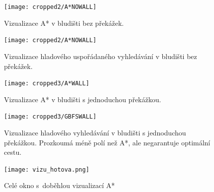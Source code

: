 \documentclass[12pt]{report}			%
\begin{document}
\begin{appendices}
\begin{figure}[h]
    
\end{figure}	








\begin{figure}[h]
\begin{minipage}[outer sep=0]{\textwidth}
\begin{minipage}[t]{0.45\textwidth}
			
			\texttt{[image: cropped2/A*NOWALL]}\caption{Vizualizace A* v bludišti bez překážek.}
			
    \end{minipage}\hfill
    \begin{minipage}[t]{0.45\textwidth}
\texttt{[image: cropped2/A*NOWALL]}\caption{Vizualizace hladového uspořádaného vyhledávání v bludišti bez překážek.}
    \end{minipage}
    \end{minipage}\vspace{1ex}
    
    \begin{minipage}[outer sep=0]{\textwidth}
\begin{minipage}[t]{0.45\textwidth}
			
			\texttt{[image: cropped3/A*WALL]}\caption{Vizualizace A* v bludišti s jednoduchou překážkou. }\label{dfs_user}
			
    \end{minipage}\hfill
    \begin{minipage}[t]{0.45\textwidth}
\texttt{[image: cropped3/GBFSWALL]}\caption{Vizualizace hladového vyhledávání v bludišti s jednoduchou překážkou. Prozkoumá méně polí než A*, ale negarantuje optimální cestu.}\label{bfs2_user}
    \end{minipage}
    \end{minipage}\vspace{1ex}
    
    
\end{figure}	










\begin{figure}
  			\centering 
  			\texttt{[image: vizu\_hotova.png]}
  			\caption{Celé okno s~doběhlou vizualizací A*}
  			\label{vizu1}
  			\end{figure}
  			
  			
\begin{figure}[h]
\begin{minipage}[outer sep=0]{\textwidth}
\begin{minipage}[t]{0.48\textwidth}
			

\end{minipage}
\end{minipage}
\end{figure}
\end{appendices}
\end{document}
